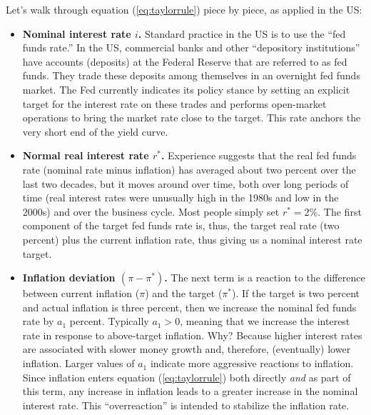 Let's walk through equation (\ref{eq:taylorrule}) piece by piece,
as applied in the US:
%
\begin{itemize}
\item \textbf{Nominal interest rate $i$.}
Standard practice in the US is to use the ``fed funds rate.''
In the US, commercial banks and other ``depository institutions'' have accounts (deposits) at the Federal Reserve that are referred to as fed funds.  They trade these deposits among themselves in an
overnight fed funds market.
The Fed currently indicates its policy stance by setting an explicit
target for the interest rate on these trades
and performs open-market operations
to bring the market rate close to the target.
This rate anchors the very short end of the yield 
 curve.

\item \textbf{Normal real interest rate $r^*$.}  Experience suggests that the real fed funds rate (nominal rate minus inflation) has averaged about two percent over the last two decades, but it moves around over time, both over long periods of time
(real interest rates were unusually high in the 1980s
and low in the 2000s)
and over the business cycle.
Most people simply set $r^* = 2\%$.
The first component of the target fed funds rate is,
thus, the target real rate (two percent) plus the current inflation rate, thus giving us a nominal interest rate target.

\item \textbf{Inflation deviation $(\pi - \pi^*)$.}  The next term is a reaction to the difference between current inflation ($\pi$)
    and the target ($\pi^*$).
If the target is two percent and actual inflation is three percent, then we
increase the nominal fed funds rate by $a_1$ percent.
Typically $a_1 > 0$, meaning that we increase the
interest rate in response to above-target inflation.
Why?  Because higher interest rates are associated with slower money growth
and, therefore, (eventually) lower inflation.
Larger values of $a_1$ indicate more aggressive reactions to inflation.
Since inflation enters equation (\ref{eq:taylorrule}) both directly \emph{and} as part of this term,
any increase in inflation leads to a greater increase in the nominal
interest rate.
This ``overreaction'' is intended to stabilize the inflation rate.


\end{itemize}
